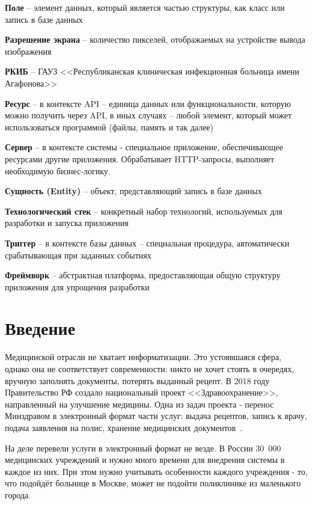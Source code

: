 \documentclass[a4paper,article]{article}
\begin{document}
    \textbf{Поле} -- элемент данных, который является частью структуры, как класс или запись в базе данных

    \textbf{Разрешение экрана} -- количество пикселей, отображаемых на устройстве вывода изображения

    \textbf{РКИБ} -- ГАУЗ <<Республиканская клиническая инфекционная больница имени Агафонова>>

    \textbf{Ресурс} -- в контексте API -- единица данных или функциональности, которую можно получить через API, в иных случаях -- любой элемент, который может использоваться программой (файлы, память и так далее)

    \textbf{Сервер} -- в контексте системы - специальное приложение, обеспечивающее ресурсами другие приложения. Обрабатывает HTTP-запросы, выполняет необходимую бизнес-логику.

    \textbf{Сущность (Entity)} -- объект, представляющий запись в базе данных

    \textbf{Технологический стек} -- конкретный набор технологий, используемых для разработки и запуска приложения

    \textbf{Триггер} -- в контексте базы данных -- специальная процедура, автоматически срабатывающая при заданных событиях

    \textbf{Фреймворк} -- абстрактная платформа, предоставляющая общую структуру приложения для упрощения разработки

    \newpage

    \section*{Введение}

        Медицинской отрасли не хватает информатизации. Это устоявшаяся сфера, однако она не соответствует современности: никто не хочет стоять в очередях, вручную заполнять документы, потерять выданный рецепт. В 2018 году Правительство РФ создало национальный проект <<Здравоохранение>>, направленный на улучшение медицины. Одна из задач проекта - перенос Минздравом в электронный формат части услуг: выдача рецептов, запись к врачу, подача заявления на полис, хранение медицинских документов~\cite{natsproektzdravoohranenie}.

        На деле перевели услуги в электронный формат не везде. В России 30~000 медицинских учреждений и нужно много времени для внедрения системы в каждое из них. При этом нужно учитывать особенности каждого учреждения - то, что подойдёт больнице в Москве, может не подойти поликлинике из маленького города.
\end{document}
